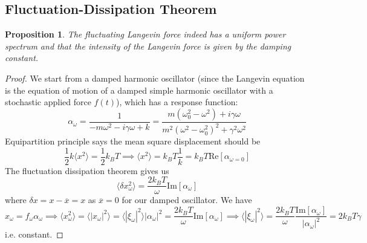 \documentclass[a4paper]{article}
\theoremstyle{new}
\newtheorem{prop}{Proposition}[section]
\begin{document}
\subsection{Fluctuation-Dissipation Theorem}









\begin{prop}
The fluctuating Langevin force indeed has a uniform power spectrum and that the intensity of the Langevin force is given by the damping constant.
\end{prop}
\begin{proof}
We start from a damped harmonic oscillator (since the Langevin equation is the equation of motion of a damped simple harmonic oscillator with a stochastic applied force $f(t)$), which has a response function:
$$\alpha_\omega=\frac{1}{-m\omega^2-i\gamma\omega+k}=\frac{m(\omega_0^2-\omega^2)+i\gamma\omega}{m^2(\omega^2-\omega_0^2)^2+\gamma^2\omega^2}$$
Equipartition principle says the mean square displacement should be
$$\frac{1}{2}k\langle x^2\rangle=\frac{1}{2}k_BT\implies\langle x^2\rangle=k_BT\frac{1}{k}=k_BT\text{Re}[\alpha_{\omega=0}]$$
The fluctuation dissipation theorem gives us
$$\langle\delta x_\omega^2\rangle=\frac{2k_BT}{\omega}\text{Im}[\alpha_\omega]$$
where $\delta x=x-\overline{x}=x$ as $\overline{x}=0$ for our damped oscillator. We have
$$x_\omega=f_\omega\alpha_\omega\implies\langle x^2_\omega\rangle=\langle|x_\omega|^2\rangle=\langle|\xi_\omega|^2\rangle|\alpha_\omega|^2=\frac{2k_BT}{\omega}\text{Im}[\alpha_\omega]\implies\langle|\xi_\omega|^2\rangle=\frac{2k_BT}{\omega}\frac{\text{Im}[\alpha_\omega]}{|\alpha_\omega|^2}=2k_BT\gamma$$
i.e. constant.
\end{proof}
\newpage


\end{document}
